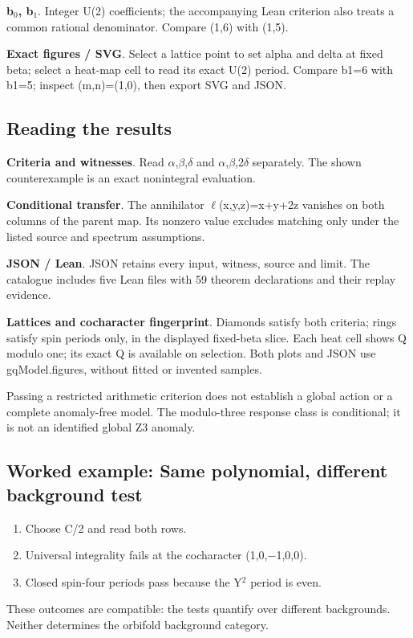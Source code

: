 \documentclass[11pt,a4paper]{article}
\begin{document}
\textbf{b\ensuremath{{}_{0}}, b\ensuremath{{}_{1}}}. Integer U(2) coefficients; the accompanying Lean criterion also treats a common rational denominator. Compare (1,6) with (1,5).

\textbf{Exact figures / SVG}. Select a lattice point to set alpha and delta at fixed beta; select a heat-map cell to read its exact U(2) period. Compare b1=6 with b1=5; inspect (m,n)=(1,0), then export SVG and JSON.

\subsection*{Reading the results}
\textbf{Criteria and witnesses}. Read \ensuremath{\alpha},\ensuremath{\beta},\ensuremath{\delta} and \ensuremath{\alpha},\ensuremath{\beta},2\ensuremath{\delta} separately. The shown counterexample is an exact nonintegral evaluation.

\textbf{Conditional transfer}. The annihilator \ensuremath{\ell}(x,y,z)=x+y+2z vanishes on both columns of the parent map. Its nonzero value excludes matching only under the listed source and spectrum assumptions.

\textbf{JSON / Lean}. JSON retains every input, witness, source and limit. The catalogue includes five Lean files with 59 theorem declarations and their replay evidence.

\textbf{Lattices and cocharacter fingerprint}. Diamonds satisfy both criteria; rings satisfy spin periods only, in the displayed fixed-beta slice. Each heat cell shows Q modulo one; its exact Q is available on selection. Both plots and JSON use gqModel.figures, without fitted or invented samples.

Passing a restricted arithmetic criterion does not establish a global action or a complete anomaly-free model. The modulo-three response class is conditional; it is not an identified global Z3 anomaly.
\subsection*{Worked example: Same polynomial, different background test}
\begin{enumerate}
\item Choose C/2 and read both rows.
\item Universal integrality fails at the cocharacter (1,0,\ensuremath{-}1,0,0).
\item Closed spin-four periods pass because the Y\ensuremath{{}^{2}} period is even.
\end{enumerate}
These outcomes are compatible: the tests quantify over different backgrounds. Neither determines the orbifold background category.
\end{document}
